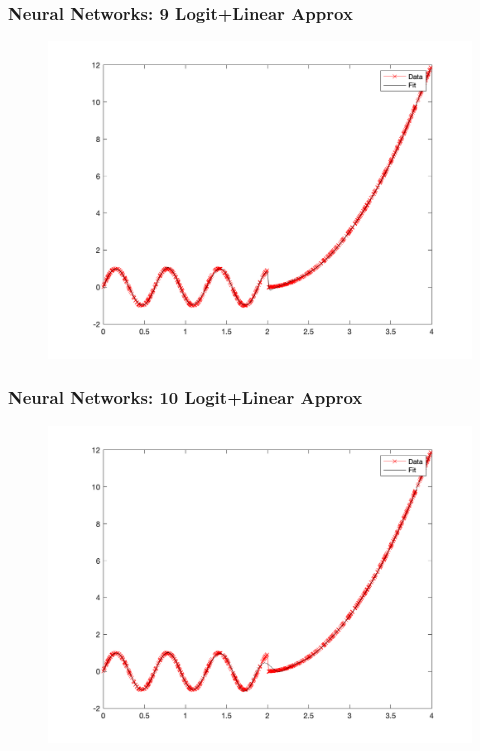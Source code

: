 \documentclass{beamer}
\begin{document}
\begin{frame}
\frametitle[alignment=center]{Neural Networks: 9 Logit+Linear Approx}
\begin{figure}
\includegraphics[scale=0.5]{NN_Example/Fig_Shallow_9.png}
\end{figure}
\end{frame}

\begin{frame}
\frametitle[alignment=center]{Neural Networks: 10 Logit+Linear Approx}
\begin{figure}
\includegraphics[scale=0.5]{NN_Example/Fig_Shallow_10.png}
\end{figure}
\end{frame}
\end{document}
